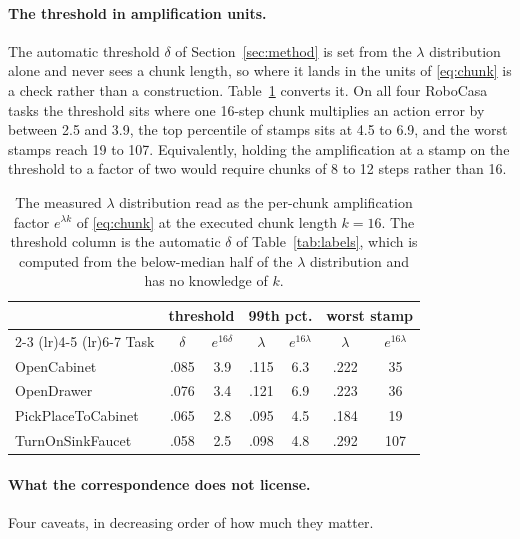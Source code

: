 \paragraph{The threshold in amplification units.}
The automatic threshold $\delta$ of Section~\ref{sec:method} is set from the
$\lambda$ distribution alone and never sees a chunk length, so where it lands in
the units of \eqref{eq:chunk} is a check rather than a construction.
Table~\ref{tab:amp} converts it. On all four RoboCasa tasks the threshold sits
where one 16-step chunk multiplies an action error by between 2.5 and 3.9, the
top percentile of stamps sits at 4.5 to 6.9, and the worst stamps reach 19 to
107. Equivalently, holding the amplification at a stamp on the threshold to a
factor of two would require chunks of 8 to 12 steps rather than 16.

\begin{table}[h]
\centering
\small
\begin{tabular}{lcccccc}
\toprule
& \multicolumn{2}{c}{threshold} & \multicolumn{2}{c}{99th pct.} & \multicolumn{2}{c}{worst stamp} \\
\cmidrule(lr){2-3} \cmidrule(lr){4-5} \cmidrule(lr){6-7}
Task & $\delta$ & $e^{16\delta}$ & $\lambda$ & $e^{16\lambda}$ & $\lambda$ & $e^{16\lambda}$ \\
\midrule
OpenCabinet & .085 & 3.9 & .115 & 6.3 & .222 & 35 \\
OpenDrawer & .076 & 3.4 & .121 & 6.9 & .223 & 36 \\
PickPlaceToCabinet & .065 & 2.8 & .095 & 4.5 & .184 & 19 \\
TurnOnSinkFaucet & .058 & 2.5 & .098 & 4.8 & .292 & 107 \\
\bottomrule
\end{tabular}
\caption{The measured $\lambda$ distribution read as the per-chunk
amplification factor $e^{\lambda k}$ of \eqref{eq:chunk} at the executed chunk
length $k{=}16$. The threshold column is the automatic $\delta$ of
Table~\ref{tab:labels}, which is computed from the below-median half of the
$\lambda$ distribution and has no knowledge of $k$.}
\label{tab:amp}
\end{table}

\paragraph{What the correspondence does not license.}
Four caveats, in decreasing order of how much they matter.

